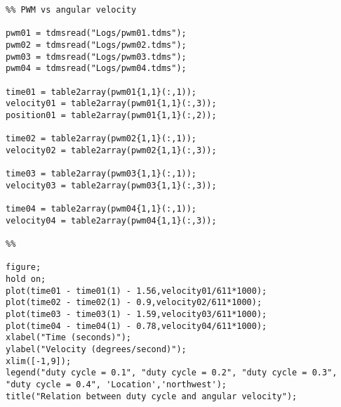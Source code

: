 \begin{lstlisting}
%% PWM vs angular velocity

pwm01 = tdmsread("Logs/pwm01.tdms");
pwm02 = tdmsread("Logs/pwm02.tdms");
pwm03 = tdmsread("Logs/pwm03.tdms");
pwm04 = tdmsread("Logs/pwm04.tdms");

time01 = table2array(pwm01{1,1}(:,1));
velocity01 = table2array(pwm01{1,1}(:,3));
position01 = table2array(pwm01{1,1}(:,2));

time02 = table2array(pwm02{1,1}(:,1));
velocity02 = table2array(pwm02{1,1}(:,3));

time03 = table2array(pwm03{1,1}(:,1));
velocity03 = table2array(pwm03{1,1}(:,3));

time04 = table2array(pwm04{1,1}(:,1));
velocity04 = table2array(pwm04{1,1}(:,3));

%%

figure;
hold on;
plot(time01 - time01(1) - 1.56,velocity01/611*1000);
plot(time02 - time02(1) - 0.9,velocity02/611*1000);
plot(time03 - time03(1) - 1.59,velocity03/611*1000);
plot(time04 - time04(1) - 0.78,velocity04/611*1000);
xlabel("Time (seconds)");
ylabel("Velocity (degrees/second)");
xlim([-1,9]);
legend("duty cycle = 0.1", "duty cycle = 0.2", "duty cycle = 0.3", "duty cycle = 0.4", 'Location','northwest');
title("Relation between duty cycle and angular velocity");
\end{lstlisting}